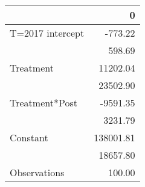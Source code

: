 \begin{tabular}{lr}
\toprule
{} &          0 \\
\midrule
T=2017 intercept &    -773.22 \\
                 &     598.69 \\
Treatment        &   11202.04 \\
                 &   23502.90 \\
Treatment*Post   &   -9591.35 \\
                 &    3231.79 \\
Constant         &  138001.81 \\
                 &   18657.80 \\
Observations     &     100.00 \\
\bottomrule
\end{tabular}
